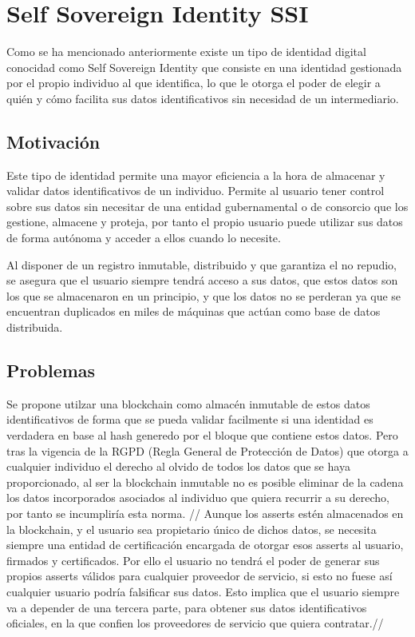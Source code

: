 \documentclass[12pt]{report}
\begin{document}
\section{Self Sovereign Identity SSI}
Como se ha mencionado anteriormente existe un tipo de identidad digital conocidad como Self Sovereign Identity que consiste en una identidad gestionada por el propio individuo al que identifica, lo que le otorga el poder de elegir a quién y cómo facilita sus datos identificativos sin necesidad de un intermediario.

\subsection{Motivación}
Este tipo de identidad permite una mayor eficiencia a la hora de almacenar y validar datos identificativos de un individuo. Permite al usuario tener control sobre sus datos sin necesitar de una entidad gubernamental o de consorcio que los gestione, almacene y proteja, por tanto el propio usuario puede utilizar sus datos de forma autónoma y acceder a ellos cuando lo necesite.

Al disponer de un registro inmutable, distribuido y que garantiza el no repudio, se asegura que el usuario siempre tendrá acceso a sus datos, que estos datos son los que se almacenaron en un principio, y que los datos no se perderan ya que se encuentran duplicados en miles de máquinas que actúan como base de datos distribuida.

\subsection{Problemas}
Se propone utilzar una blockchain como almacén inmutable de estos datos identificativos de forma que se pueda validar facilmente si una identidad es verdadera en base al hash generedo por el bloque que contiene estos datos. Pero tras la vigencia de la RGPD (Regla General de Protección de Datos) que otorga a cualquier individuo el derecho al olvido de todos los datos que se haya proporcionado, al ser la blockchain inmutable no es posible eliminar de la cadena los datos incorporados asociados al individuo que quiera recurrir a su derecho, por tanto se incumpliría esta norma.
//
Aunque los asserts estén almacenados en la blockchain, y el usuario sea propietario único de dichos datos, se necesita siempre una entidad de certificación encargada de otorgar esos asserts al usuario, firmados y certificados. Por ello el usuario no tendrá el poder de generar sus propios asserts válidos para cualquier proveedor de servicio, si esto no fuese así cualquier usuario podría falsificar sus datos. Esto implica que el usuario siempre va a depender de una tercera parte, para obtener sus datos identificativos oficiales, en la que confien los proveedores de servicio que quiera contratar.//
\end{document}
